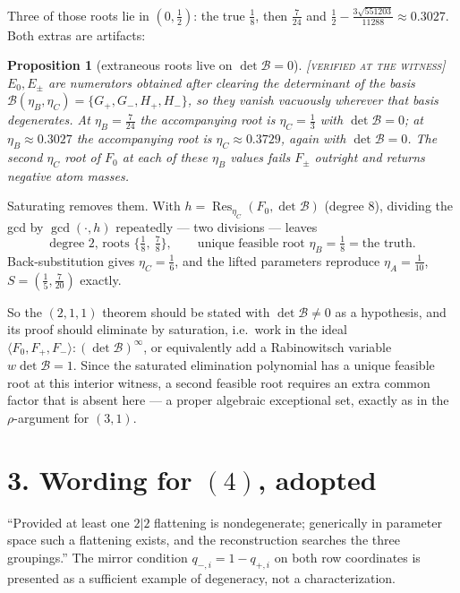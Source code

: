 \documentclass[11pt]{article}
\newtheorem{proposition}{Proposition}
\theoremstyle{remark}
\newcommand{\status}[1]{\hfill{\normalfont\small\textsc{[#1]}}}
\begin{document}
Three of those roots lie in $(0,\tfrac12)$: the true $\tfrac18$, then $\tfrac7{24}$ and $\tfrac12-\tfrac{3\sqrt{551203}}{11288}\approx0.3027$. Both extras are artifacts:

\begin{proposition}[extraneous roots live on $\det\mathcal B=0$]\status{verified at the witness}
$E_0,E_\pm$ are numerators obtained after clearing the determinant of the basis $\mathcal B(\eta_B,\eta_C)=\{G_+,G_-,H_+,H_-\}$, so they vanish vacuously wherever that basis degenerates. At $\eta_B=\tfrac7{24}$ the accompanying root is $\eta_C=\tfrac13$ with $\det\mathcal B=0$; at $\eta_B\approx0.3027$ the accompanying root is $\eta_C\approx0.3729$, again with $\det\mathcal B=0$. The second $\eta_C$ root of $F_0$ at each of these $\eta_B$ values fails $F_\pm$ outright and returns negative atom masses.
\end{proposition}

Saturating removes them. With $h=\operatorname{Res}_{\eta_C}(F_0,\det\mathcal B)$ (degree 8), dividing the gcd by $\gcd(\cdot,h)$ repeatedly --- two divisions --- leaves
\[
\text{degree 2, roots }\{\tfrac18,\ \tfrac78\},\qquad\text{unique feasible root }\eta_B=\tfrac18=\text{the truth.}
\]
Back-substitution gives $\eta_C=\tfrac16$, and the lifted parameters reproduce $\eta_A=\tfrac1{10}$, $S=(\tfrac15,\tfrac7{20})$ exactly.

So the $(2,1,1)$ theorem should be stated with $\det\mathcal B\neq0$ as a hypothesis, and its proof should eliminate by saturation, i.e.\ work in the ideal $\langle F_0,F_+,F_-\rangle:(\det\mathcal B)^\infty$, or equivalently add a Rabinowitsch variable $w\det\mathcal B=1$. Since the saturated elimination polynomial has a unique feasible root at this interior witness, a second feasible root requires an extra common factor that is absent here --- a proper algebraic exceptional set, exactly as in the $\rho$-argument for $(3,1)$.

\section*{3. Wording for $(4)$, adopted}

``Provided at least one $2|2$ flattening is nondegenerate; generically in parameter space such a flattening exists, and the reconstruction searches the three groupings.'' The mirror condition $q_{-,i}=1-q_{+,i}$ on both row coordinates is presented as a sufficient example of degeneracy, not a characterization.
\end{document}
